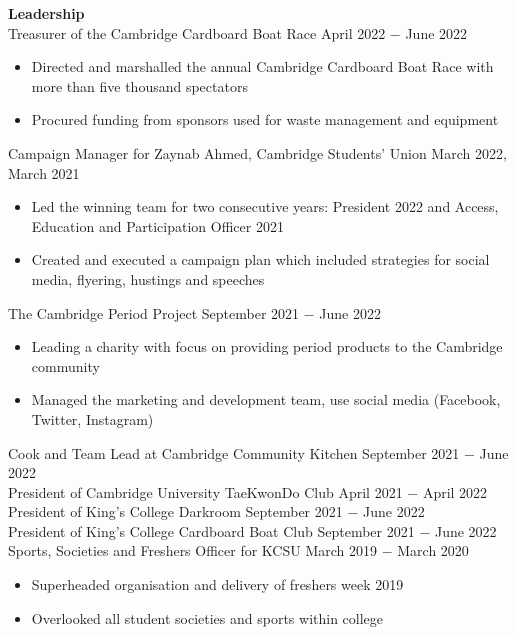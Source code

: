 \documentclass{article}
\begin{document}
\textbf{Leadership}\\
Treasurer of the Cambridge Cardboard Boat Race \hfill April 2022 $-$ June 2022
\begin{itemize}
    \item Directed and marshalled the annual Cambridge Cardboard Boat Race with more than five thousand spectators
    \item Procured funding from sponsors used for waste management and equipment
\end{itemize}
Campaign Manager for Zaynab Ahmed, Cambridge Students' Union \hfill March 2022, March 2021
\begin{itemize}
    \item Led the winning team for two consecutive years: President 2022 and Access, Education and Participation Officer 2021
    \item Created and executed a campaign plan which included strategies for social media, flyering, hustings and speeches
\end{itemize}
The Cambridge Period Project \hfill  September 2021 $-$  June 2022
\begin{itemize}
    \item Leading a charity with focus on providing period products to the Cambridge community
    \item Managed the marketing and development team, use social media (Facebook, Twitter, Instagram)
\end{itemize}
Cook and Team Lead at Cambridge Community Kitchen \hfill September 2021 $-$ June 2022\\
President of Cambridge University TaeKwonDo Club \hfill April 2021 $-$ April 2022\\
President of King's College Darkroom \hfill September 2021 $-$ June 2022 \\ 
President of King's College Cardboard Boat Club \hfill September 2021 $-$ June 2022 \\
Sports, Societies and Freshers Officer for KCSU \hfill March 2019 $-$ March 2020
\begin{itemize}
    \item Superheaded organisation and delivery of freshers week 2019
    \item Overlooked all student societies and sports within college
\end{itemize} \medskip
\end{document}
